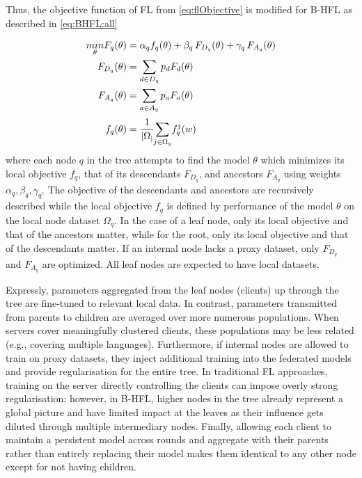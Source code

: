 Thus, the objective function of FL from \cref{eq:flObjective} is modified for B-HFL as described in \cref{eq:BHFL:all}

\begin{subequations}
    \begin{align}
        \underset{\theta}{min} F_q(\theta) & = \alpha_q f_q(\theta) + \beta_q \, F_{D_q}(\theta) + \gamma_q \, F_{A_q}(\theta) \\
        F_{D_q}(\theta)                    & = \sum_{d \in D_q} p_d F_d(\theta)                                                \\
        F_{A_q}(\theta)                    & = \sum_{a \in A_q} p_a F_a(\theta)                                                \\
        f_q(\theta)                        & = \cfrac{1}{\lvert \Omega_ \rvert} \underset{j \in \Omega_q}{\sum} f_q^j(w)
    \end{align}
    \label{eq:BHFL:all}
\end{subequations}
where each node $q$ in the tree attempts to find the model $\theta$ which minimizes its local objective $f_q$, that of its descendants $F_{D_q}$, and ancestors $F_{A_q}$ using weights $\alpha_q,\beta_q,\gamma_q$. The objective of the descendants and ancestors are recursively described while the local objective $f_q$ is defined by performance of the model $\theta$ on the local node dataset $\Omega_q$. In the case of a leaf node, only its local objective and that of the ancestors matter, while for the root, only its local objective and that of the descendants matter. If an internal node lacks a proxy dataset, only $F_{D_q}$ and $F_{A_q}$ are optimized. All leaf nodes are expected to have local datasets.

Expressly, parameters aggregated from the leaf nodes (clients) up through the tree are fine-tuned to relevant local data. In contrast, parameters transmitted from parents to children are averaged over more numerous populations. When servers cover meaningfully clustered clients, these populations may be less related (e.g., covering multiple languages). Furthermore, if internal nodes are allowed to train on proxy datasets, they inject additional training into the federated models and provide regularisation for the entire tree. In traditional FL approaches, training on the server directly controlling the clients can impose overly strong regularisation; however, in B-HFL, higher nodes in the tree already represent a global picture and have limited impact at the leaves as their influence gets diluted through multiple intermediary nodes. Finally, allowing each client to maintain a persistent model across rounds and aggregate with their parents rather than entirely replacing their model makes them identical to any other node except for not having children.

